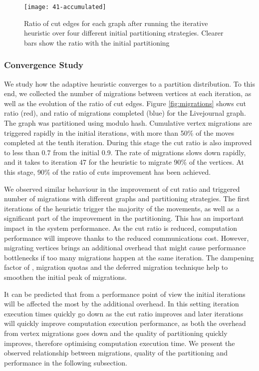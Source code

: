 \documentclass{sig-alternate-10pt}
\begin{document}
\begin{figure}
  \centering
    \texttt{[image: 41-accumulated]}
       \vspace{-10pt}
  \caption{ Ratio of cut edges for each graph after running the iterative heuristic over four different initial partitioning strategies. Clearer bars show the ratio with the initial partitioning}
         \vspace{-10pt}
  \label{fig:41-accumulated}
\end{figure}

\subsubsection{Convergence Study}

We study how the adaptive heuristic converges to a partition distribution. To this end, we collected the number of migrations between vertices at each iteration, as well as the evolution of the ratio of cut edges. Figure \ref{fig:migrations} shows cut ratio (red), and ratio of migrations completed (blue) for the Livejournal graph. The graph was partitioned using modulo hash. Cumulative vertex migrations are triggered rapidly in the initial iterations, with more than 50\% of the moves completed at the tenth iteration. During this stage the cut ratio is also improved to less than 0.7 from the initial 0.9. The rate of migrations slows down rapidly, and it takes to iteration 47 for the heuristic to migrate 90\% of the vertices. At this stage, 90\% of the ratio of cuts improvement has been achieved. 

We observed similar behaviour in the improvement of cut ratio and triggered number of migrations with different graphs and partitioning strategies. The first iterations of the heuristic trigger the majority of the movements, as well as a significant part of the improvement in the partitioning. This has an important impact in the system performance. As the cut ratio is reduced, computation performance will improve thanks to the reduced communications cost. However, migrating vertices brings an additional overhead that might cause performance bottlenecks if too many migrations happen at the same iteration. The dampening factor of , migration quotas and the deferred migration technique help to smoothen the initial peak of migrations. 

It can be predicted that from a performance point of view the initial iterations will be affected the most by the additional overhead. In this setting iteration execution times quickly go down as the cut ratio improves and later iterations will quickly improve computation execution performance, as both the overhead from vertex migrations goes down and the quality of partitioning quickly improves, therefore optimising computation execution time. We present the observed relationship between migrations, quality of the partitioning and performance in the following subsection.
\end{document}
